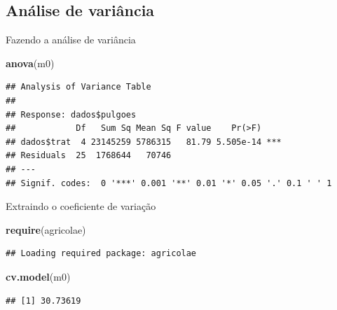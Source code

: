 \documentclass[
]{book}
\newenvironment{Shaded}{\begin{snugshade}}{\end{snugshade}}
\newcommand{\KeywordTok}[1]{\textcolor[rgb]{0.13,0.29,0.53}{\textbf{#1}}}
\newcommand{\NormalTok}[1]{#1}
\newcommand{\OperatorTok}[1]{\textcolor[rgb]{0.81,0.36,0.00}{\textbf{#1}}}
\newcommand{\StringTok}[1]{\textcolor[rgb]{0.31,0.60,0.02}{#1}}
\begin{document}
\hypertarget{anuxe1lise-de-variuxe2ncia}{%
\subsection{Análise de variância}\label{anuxe1lise-de-variuxe2ncia}}

Fazendo a análise de variância

\begin{Shaded}
\end{Shaded}

\begin{Shaded}
\begin{Highlighting}[]
\KeywordTok{anova}\NormalTok{(m0)}
\end{Highlighting}
\end{Shaded}

\begin{verbatim}
## Analysis of Variance Table
## 
## Response: dados$pulgoes
##            Df   Sum Sq Mean Sq F value    Pr(>F)    
## dados$trat  4 23145259 5786315   81.79 5.505e-14 ***
## Residuals  25  1768644   70746                      
## ---
## Signif. codes:  0 '***' 0.001 '**' 0.01 '*' 0.05 '.' 0.1 ' ' 1
\end{verbatim}

Extraindo o coeficiente de variação

\begin{Shaded}
\begin{Highlighting}[]
\KeywordTok{require}\NormalTok{(agricolae)}
\end{Highlighting}
\end{Shaded}

\begin{verbatim}
## Loading required package: agricolae
\end{verbatim}

\begin{Shaded}
\begin{Highlighting}[]
\KeywordTok{cv.model}\NormalTok{(m0)}
\end{Highlighting}
\end{Shaded}

\begin{verbatim}
## [1] 30.73619
\end{verbatim}
\end{document}
